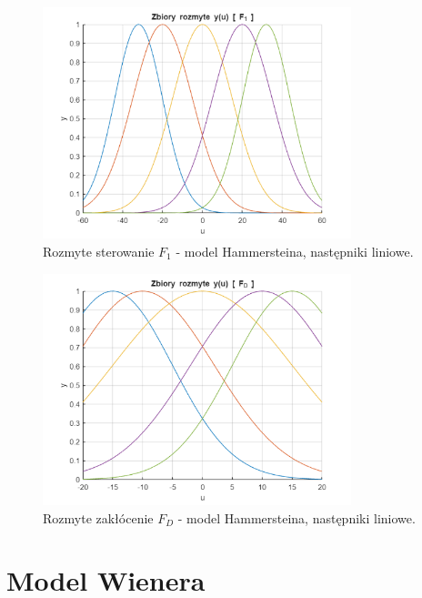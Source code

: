 \begin{figure}[h!]
\centering
\includegraphics[width=0.8\textwidth]{pictures/fuzzy_hamm_f1_lin}
\caption{Rozmyte sterowanie $F_1$ - model Hammersteina, następniki liniowe.}
\end{figure}

\begin{figure}[h!]
\centering
\includegraphics[width=0.8\textwidth]{pictures/fuzzy_hamm_fd_lin}
\caption{Rozmyte zakłócenie $F_D$ - model Hammersteina, następniki liniowe.}
\end{figure}

\newpage

\section{Model Wienera}

